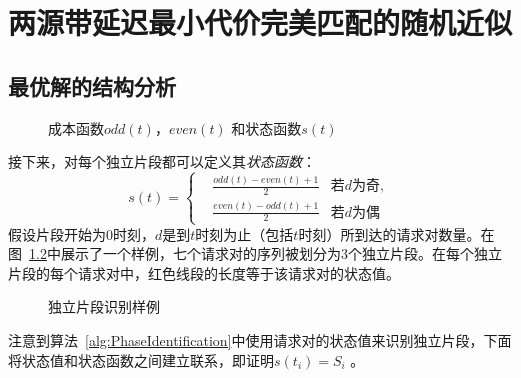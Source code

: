 \chapter{两源带延迟最小代价完美匹配的随机近似}


\section{最优解的结构分析} \label{sec:3-optimal}

\begin{figure}[ht]
    \centering
    \begin{minipage}{0.7\textwidth}
    \end{minipage}
    \centering
    \begin{minipage}{0.7\textwidth}
        \subfloat[状态函数$s(t)$]{
             
            \label{fig:statefunction}
        }
    \end{minipage}
    \caption{成本函数$odd(t)$，$even(t)$ 和状态函数$s(t)$}
    \label{fig:Cost_State}
\end{figure}

接下来，对每个独立片段都可以定义其\emph{状态函数}：
\begin{equation*}
    s(t) = 
    \left\{
    \begin{aligned}
        & \frac{odd(t) - even(t) + 1}{2} & \text{若$d$为奇}, \\
        & \frac{even(t) - odd(t) + 1}{2} & \text{若$d$为偶}
    \end{aligned}
    \right.
\end{equation*}
假设片段开始为$0$时刻，$d$是到$t$时刻为止（包括$t$时刻）所到达的请求对数量。在图~\ref{fig:phase_partition}中展示了一个样例，七个请求对的序列被划分为$3$个独立片段。在每个独立片段的每个请求对中，红色线段的长度等于该请求对的状态值。

\begin{figure}[htb]
    \centering
    
    \caption{独立片段识别样例}
    \label{fig:phase_partition}
\end{figure}

注意到算法~\ref{alg:PhaseIdentification}中使用请求对的状态值来识别独立片段，下面将状态值和状态函数之间建立联系，即证明$s(t_i) = S_i$ 。


